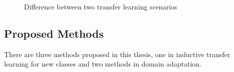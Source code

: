 \begin{figure}[h]
	\centering
	\qquad
	\caption{Difference between two transfer learning scenarios}\label{fig:intro:cmp}
\end{figure}


\subsection{Proposed Methods}
There are three methods proposed in this thesis, one in inductive transfer learning for new classes and two methods in domain adaptation.


